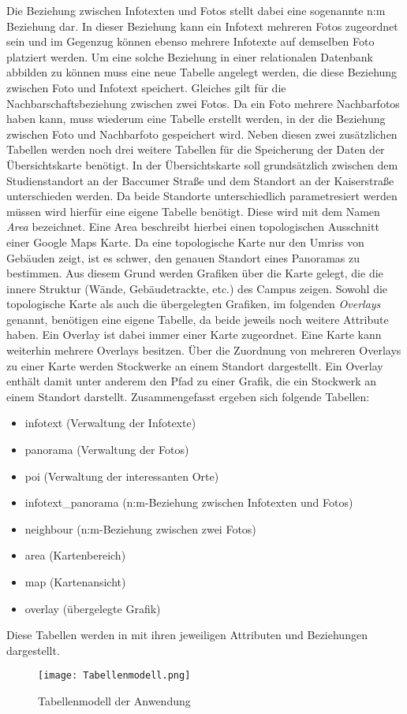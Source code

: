 Die Beziehung zwischen Infotexten und Fotos stellt dabei eine sogenannte
n:m Beziehung dar. In dieser Beziehung kann ein Infotext mehreren Fotos
zugeordnet sein und im Gegenzug können ebenso mehrere Infotexte auf demselben
Foto platziert werden. Um eine solche Beziehung in einer relationalen Datenbank
abbilden zu können muss eine neue Tabelle angelegt werden, die diese Beziehung
zwischen Foto und Infotext speichert. Gleiches gilt für die
Nachbarschaftsbeziehung zwischen zwei Fotos. Da ein Foto mehrere Nachbarfotos
haben kann, muss wiederum eine Tabelle erstellt werden, in der die Beziehung
zwischen Foto und Nachbarfoto gespeichert wird. Neben diesen zwei zusätzlichen
Tabellen werden noch drei weitere Tabellen für die Speicherung der Daten der
Übersichtskarte benötigt. In der Übersichtskarte soll grundsätzlich zwischen dem
Studienstandort an der Baccumer Straße und dem Standort an der Kaiserstraße
unterschieden werden. Da beide Standorte unterschiedlich parametresiert werden 
müssen wird hierfür eine eigene Tabelle benötigt. Diese wird mit dem Namen
\textit{Area} bezeichnet. Eine Area beschreibt hierbei einen topologischen
Ausschnitt einer Google Maps Karte. Da eine topologische Karte nur den Umriss
von Gebäuden zeigt, ist es schwer, den genauen Standort eines Panoramas zu
bestimmen. Aus diesem Grund werden Grafiken über die Karte gelegt, die die
innere Struktur (Wände, Gebäudetrackte, etc.) des Campus zeigen. Sowohl die
topologische Karte als auch die übergelegten Grafiken, im folgenden
\textit{Overlays} genannt, benötigen eine eigene Tabelle, da beide jeweils noch
weitere Attribute haben. Ein Overlay ist dabei immer einer Karte zugeordnet.
Eine Karte kann weiterhin mehrere Overlays besitzen. Über die Zuordnung von
mehreren Overlays zu einer Karte werden Stockwerke an einem Standort
dargestellt. Ein Overlay enthält damit unter anderem den Pfad zu einer Grafik,
die ein Stockwerk an einem Standort darstellt. Zusammengefasst ergeben sich
folgende Tabellen:

\begin{itemize}
  \item infotext (Verwaltung der Infotexte)
  \item panorama (Verwaltung der Fotos)
  \item poi (Verwaltung der interessanten Orte)
  \item infotext\_panorama (n:m-Beziehung zwischen Infotexten und Fotos)
  \item neighbour (n:m-Beziehung zwischen zwei Fotos)
  \item area (Kartenbereich)
  \item map (Kartenansicht)
  \item overlay (übergelegte Grafik)
\end{itemize}

Diese Tabellen werden in  mit ihren jeweiligen
Attributen und Beziehungen dargestellt.

\begin{figure}[htb]
\centering
\texttt{[image: Tabellenmodell.png]}
\caption[Tabellenmodell der Anwendung]{Tabellenmodell der Anwendung\protect\footnotemark}
\label{fig:Tabellenmodell}
\end{figure}

